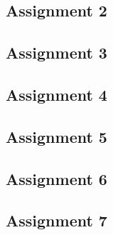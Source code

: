 \documentclass[10pt]{article}
\begin{document}
    \subsection{Assignment 2}

    \subsection{Assignment 3}

    \subsection{Assignment 4}

    \subsection{Assignment 5}

    \subsection{Assignment 6}

    \subsection{Assignment 7}
\end{document}
